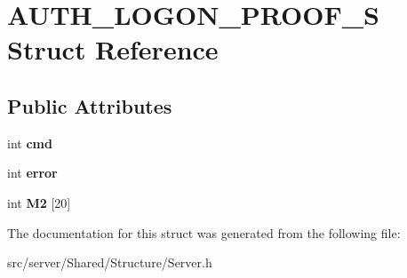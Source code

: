 \hypertarget{struct_a_u_t_h___l_o_g_o_n___p_r_o_o_f___s}{\section{A\-U\-T\-H\-\_\-\-L\-O\-G\-O\-N\-\_\-\-P\-R\-O\-O\-F\-\_\-\-S Struct Reference}
\label{struct_a_u_t_h___l_o_g_o_n___p_r_o_o_f___s}
}
\subsection*{Public Attributes}
\begin{DoxyCompactItemize}
\item 
\hypertarget{struct_a_u_t_h___l_o_g_o_n___p_r_o_o_f___s_a30828bf0578791a8b330490a409716b0}{int {\bfseries cmd}}\label{struct_a_u_t_h___l_o_g_o_n___p_r_o_o_f___s_a30828bf0578791a8b330490a409716b0}

\item 
\hypertarget{struct_a_u_t_h___l_o_g_o_n___p_r_o_o_f___s_a28ceb2a20906e022ac88b185a3ebac41}{int {\bfseries error}}\label{struct_a_u_t_h___l_o_g_o_n___p_r_o_o_f___s_a28ceb2a20906e022ac88b185a3ebac41}

\item 
\hypertarget{struct_a_u_t_h___l_o_g_o_n___p_r_o_o_f___s_a0f5a8b365ae22988210d4e70ef102581}{int {\bfseries M2} \mbox{[}20\mbox{]}}\label{struct_a_u_t_h___l_o_g_o_n___p_r_o_o_f___s_a0f5a8b365ae22988210d4e70ef102581}

\end{DoxyCompactItemize}


The documentation for this struct was generated from the following file\-:\begin{DoxyCompactItemize}
\item 
src/server/\-Shared/\-Structure/Server.\-h\end{DoxyCompactItemize}
